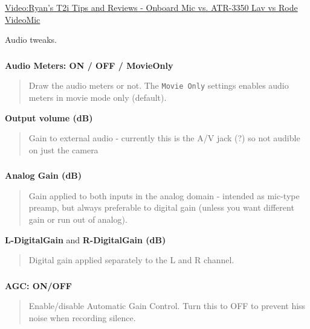 \documentclass[a4paper,english]{article}
\begin{document}
\href{http://magiclantern.wikia.com/wiki/Video\%3ARyan\%27s\%20T2i\%20Tips\%20and\%20Reviews\%20-\%20Onboard\%20Mic\%20vs.\%20ATR-3350\%20Lav\%20vs\%20Rode\%20VideoMic}{Video:Ryan's T2i Tips and Reviews - Onboard Mic vs. ATR-3350 Lav vs Rode VideoMic}

Audio tweaks.
\vspace{-10mm}\subsubsection*{}\label{audio-meters}
\textbf{Audio Meters: ON / OFF / MovieOnly}
%
\begin{quote}

Draw the audio meters or not. The \texttt{Movie Only} settings enables audio meters in movie mode only (default).

\end{quote}

\textbf{Output volume (dB)}
%
\begin{quote}

Gain to external audio - currently this is the A/V jack (?) so not audible on just the camera

\end{quote}
\vspace{-10mm}\subsubsection*{}\label{manual-audio-controls}
\textbf{Analog Gain (dB)}
%
\begin{quote}

Gain applied to both inputs in the analog domain - intended as mic-type preamp, but always preferable to digital gain (unless you want different gain or run out of analog).

\end{quote}

\textbf{L-DigitalGain} and \textbf{R-DigitalGain (dB)}
%
\begin{quote}

Digital gain applied separately to the L and R channel.

\end{quote}
\vspace{-10mm}\subsubsection*{}\label{disable-agc}
\textbf{AGC: ON/OFF}
%
\begin{quote}

Enable/disable Automatic Gain Control. Turn this to OFF to prevent hiss noise when recording silence.

\end{quote}
\end{document}

